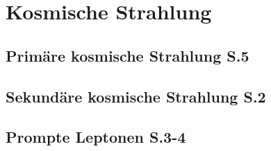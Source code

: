 \thispagestyle{plain}
\chapter{Kosmische Strahlung}

\section{Primäre kosmische Strahlung S.5}
\section{Sekundäre kosmische Strahlung S.2}
\section{Prompte Leptonen S.3-4}